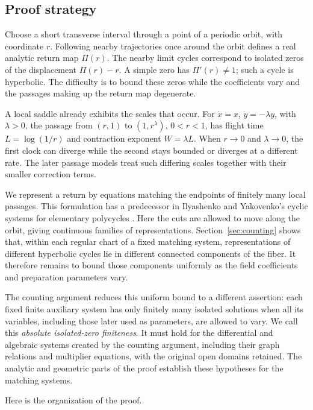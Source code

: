 \subsection{Proof strategy}

Choose a short transverse interval through a point of a periodic orbit,
with coordinate \(r\). Following nearby trajectories once around the
orbit defines a real analytic return map \(\Pi(r)\). The nearby limit
cycles correspond to isolated zeros of the displacement \(\Pi(r)-r\).
A simple zero has \(\Pi'(r)\ne1\); such a cycle is hyperbolic. The
difficulty is to bound these zeros while the coefficients vary and the
passages making up the return map degenerate.

A local saddle already exhibits the scales that occur. For
\(\dot x=x\), \(\dot y=-\lambda y\), with \(\lambda>0\), the
passage from \((r,1)\) to \((1,r^\lambda)\), \(0<r<1\), has
flight time \(L=\log(1/r)\) and contraction exponent \(W=\lambda L\).
When \(r\to0\) and \(\lambda\to0\), the first clock can diverge
while the second stays bounded or diverges at a different rate. The
later passage models treat such differing scales together with their
smaller correction terms.

We represent a return by equations matching the endpoints of finitely
many local passages. This formulation has a predecessor in Ilyashenko
and Yakovenko's cyclic systems for elementary polycycles
\citep[\S0.4]{IlyashenkoYakovenko1995}. Here the cuts are allowed to
move along the orbit, giving continuous families of representations.
Section~\ref{sec:counting} shows that, within each regular chart of a
fixed matching system, representations of different hyperbolic cycles
lie in different connected components of the fiber. It therefore
remains to bound those components uniformly as
the field coefficients and preparation parameters vary.

The counting argument reduces this uniform bound to a different
assertion: each fixed finite auxiliary system has only finitely many
isolated solutions when all its variables, including those later used
as parameters, are allowed to vary. We call this \emph{absolute
isolated-zero finiteness}. It must hold for the differential and
algebraic systems created by the counting argument, including their
graph relations and multiplier equations, with the original open
domains retained. The analytic and geometric parts of the proof
establish these hypotheses for the matching systems.

Here is the organization of the proof.

